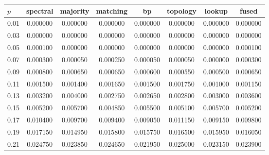 \begin{tabular}{lccccccc}
\toprule
$p$ & spectral & majority & matching & bp & topology & lookup & fused \\
\midrule
0.01 & 0.000000 & 0.000000 & 0.000000 & 0.000000 & 0.000000 & 0.000000 & 0.000000 \\
0.03 & 0.000000 & 0.000000 & 0.000000 & 0.000000 & 0.000000 & 0.000000 & 0.000000 \\
0.05 & 0.000100 & 0.000000 & 0.000000 & 0.000000 & 0.000000 & 0.000000 & 0.000100 \\
0.07 & 0.000300 & 0.000050 & 0.000250 & 0.000050 & 0.000050 & 0.000000 & 0.000300 \\
0.09 & 0.000800 & 0.000650 & 0.000650 & 0.000600 & 0.000550 & 0.000500 & 0.000650 \\
0.11 & 0.001500 & 0.001400 & 0.001650 & 0.001500 & 0.001750 & 0.001000 & 0.001150 \\
0.13 & 0.003200 & 0.004000 & 0.002750 & 0.002650 & 0.002800 & 0.003000 & 0.003600 \\
0.15 & 0.005200 & 0.005700 & 0.004850 & 0.005500 & 0.005100 & 0.005700 & 0.005200 \\
0.17 & 0.010400 & 0.009700 & 0.009400 & 0.009050 & 0.011150 & 0.009150 & 0.009800 \\
0.19 & 0.017150 & 0.014950 & 0.015800 & 0.015750 & 0.016500 & 0.015950 & 0.016050 \\
0.21 & 0.024750 & 0.023850 & 0.024650 & 0.021950 & 0.025000 & 0.023150 & 0.023900 \\
\bottomrule
\end{tabular}

